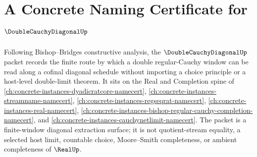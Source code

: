 \chapter{A Concrete Naming Certificate for $\DoubleCauchyDiagonalUp$}
\label{ch:concrete-instances-double-cauchy-diagonal-namecert}

Following Bishop--Bridges constructive analysis, the $\DoubleCauchyDiagonalUp$ packet records the finite route by which a double regular-Cauchy window can be read along a cofinal diagonal schedule without importing a choice principle or a host-level double-limit theorem. It sits on the Real and Completion spine of \autoref{ch:concrete-instances-dyadicratcore-namecert}, \autoref{ch:concrete-instances-streamname-namecert}, \autoref{ch:concrete-instances-regseqrat-namecert}, \autoref{ch:concrete-instances-real-namecert}, \autoref{ch:concrete-instances-bishop-regular-cauchy-completion-namecert}, and \autoref{ch:concrete-instances-cauchynetlimit-namecert}. The packet is a finite-window diagonal extraction surface; it is not quotient-stream equality, a selected host limit, countable choice, Moore--Smith completeness, or ambient completeness of $\RealUp$.

